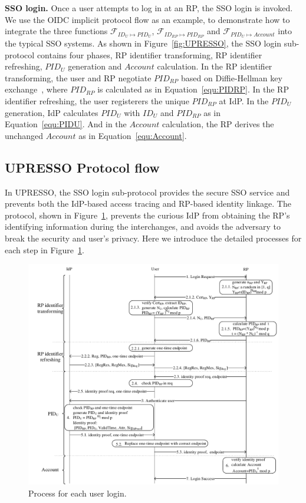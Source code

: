 \vspace{1mm}\noindent\textbf{SSO login.}
Once a user attempts to log in at an RP, the SSO login is invoked. We use the OIDC implicit protocol flow as an example, to demonstrate  how to integrate the three functions $\mathcal{F}_{ID_{U} \mapsto PID_{U}}$, $\mathcal{F}_{ID_{RP} \mapsto PID_{RP}}$ and $\mathcal{F}_{PID_{U} \mapsto Account}$ into the typical SSO systems.
As shown in Figure~\ref{fig:UPRESSO}, the SSO login sub-protocol contains four phases, RP identifier transforming, RP identifier refreshing, $PID_U$ generation and $Account$ calculation.
In the RP identifier transforming, the user and RP negotiate $PID_{RP}$ based on Diffie-Hellman key exchange~\cite{DiffieH76}, where $PID_{RP}$ is calculated as in Equation~\ref{equ:PIDRP}.
In the RP identifier refreshing, the user registerers the unique  $PID_{RP}$ at IdP.
In the $PID_U$ generation, IdP calculates $PID_U$ with $ID_U$ and $PID_{RP}$ as in Equation~\ref{equ:PIDU}.
And in the $Account$ calculation, the RP derives the unchanged $Account$ as in Equation~\ref{equ:Account}.

\subsection{UPRESSO Protocol flow}
\label{sebsec:loginprocess}
In UPRESSO, the SSO login sub-protocol provides the secure SSO service and prevents both the IdP-based access tracing and RP-based identity linkage.
The protocol, shown in Figure~\ref{fig:process},  prevents the curious IdP from obtaining the RP's identifying information during the interchanges,
  and avoids the adversary to break the security and user's privacy.
Here we introduce the detailed processes for each step in Figure~\ref{fig:process}.

\begin{figure}
  \centering
  \includegraphics[width=0.85\linewidth]{fig/process.pdf}
  \caption{Process for each user login.}
  \label{fig:process}
\end{figure}

